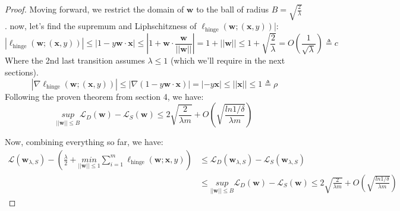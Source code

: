 \begin{proof}
    Moving forward, we restrict the domain of $\boldsymbol{w}$ to the ball of radius $B=\sqrt{\frac{2}{\lambda}}$. now, let's find the supremum and Liphschitzness of $\ell_{\text{hinge}}(\boldsymbol{w};(\boldsymbol{x}, y))$|:
    \begin{equation*}
        |\ell_{\text{hinge}}(\boldsymbol{w};(\boldsymbol{x}, y))| \leq |1-y\boldsymbol{w}\cdot\boldsymbol{x}| \leq |1 + \boldsymbol{w}\cdot \frac{\boldsymbol{w}}{||\boldsymbol{w}||}| = 1 + ||\boldsymbol{w}|| \leq 1+\sqrt{\frac{2}{\lambda}} = O(\frac{1}{\sqrt{\lambda}}) \triangleq c
    \end{equation*}
    Where the 2nd last transition assumes $\lambda \leq 1$ (which we'll require in the next sections).
    \begin{equation*}
        |\nabla \ell_{\text{hinge}}(\boldsymbol{w};(\boldsymbol{x}, y))| \leq |\nabla (1-y\boldsymbol{w}\cdot\boldsymbol{x})| = |-y\boldsymbol{x}| \leq ||\boldsymbol{x}|| \leq 1 \triangleq \rho
    \end{equation*}
    Following the proven theorem from section 4, we have:
    \begin{equation*}
        \underset{||\boldsymbol{w}|| \leq B}{sup} \mathcal{L}_D(\boldsymbol{w}) - \mathcal{L}_S(\boldsymbol{w}) \leq 2 \sqrt{\frac{2}{\lambda m}} + O\left(\sqrt{\frac{ln 1/\delta}{\lambda m}} \right)
    \end{equation*}

    Now, combining everything so far, we have:
    \begin{equation*}
        \begin{split}      
            \mathcal{L}(\boldsymbol{w}_{\lambda, S}) - \left(\frac{\lambda}{2} + \underset{||\boldsymbol{w}||\leq 1}{min} \sum_{i=1}^m \ell_{\text{hinge}}(\boldsymbol{w}; \boldsymbol{x}, y)\right)
            &\leq \mathcal{L}_D(\boldsymbol{w}_{\lambda, S}) - \mathcal{L}_S(\boldsymbol{w}_{\lambda, S}) \\
            &\leq \underset{||\boldsymbol{w}|| \leq B}{sup} \mathcal{L}_D(\boldsymbol{w}) - \mathcal{L}_S(\boldsymbol{w}) \leq 2 \sqrt{\frac{2}{\lambda m}} + O\left(\sqrt{\frac{ln 1/\delta}{\lambda m}} \right)
        \end{split}
    \end{equation*}


\end{proof}
